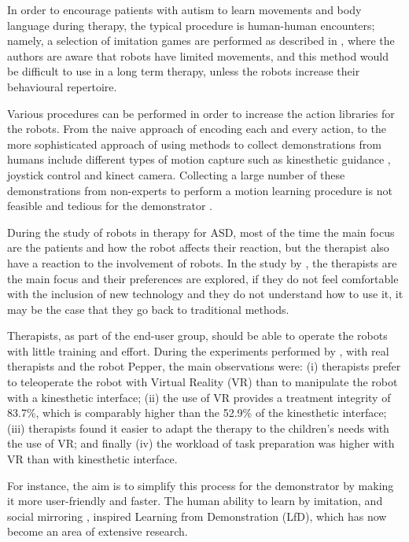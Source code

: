\documentclass[thesis]{mas_proposal}
\begin{document}
    In order to encourage patients with autism to learn movements and body language during therapy, the typical procedure is human-human encounters; namely, a selection of imitation games are performed as described in \cite{Dautenhahn2004}, where the authors are aware that robots have limited movements, and this method would be difficult to use in a long term therapy, unless the robots increase their behavioural repertoire.
    
    Various procedures can be performed in order to increase the action libraries for the robots. From the naive approach of encoding each and every action, to the more sophisticated approach of using methods to collect demonstrations from humans include different types of motion capture such as kinesthetic guidance \cite{Kronander2013}, joystick control \cite{Jiang2013} and kinect camera\cite{Assad2020}. Collecting a large number of these demonstrations from non-experts to perform a motion learning procedure is not feasible and tedious for the demonstrator \cite{Chen2022}.
    
    During the study of robots in therapy for ASD, most of the time the main focus are the patients and how the robot affects their reaction, but the therapist also have a reaction to the involvement of robots. In the study by \cite{Kulikovskiy2021}, the therapists are the main focus and their preferences are explored, if they do not feel comfortable with the inclusion of new technology and they do not understand how to use it, it may be the case that they go back to traditional methods.
    
    Therapists, as part of the end-user group, should be able to operate the robots with little training and effort. During the experiments performed by \cite{Kulikovskiy2021}, with real therapists and the robot Pepper, the main observations were: (i) therapists prefer to teleoperate the robot with Virtual Reality (VR) than to manipulate the robot with a kinesthetic interface; (ii) the use of VR provides a treatment integrity of 83.7\%, which is comparably higher than the 52.9\% of the kinesthetic interface; (iii) therapists found it easier to adapt the therapy to the children's needs with the use of VR; and finally (iv) the workload of task preparation was higher with VR than with kinesthetic interface. 
       
    For instance, the aim is to simplify this process for the demonstrator by making it more user-friendly and faster. The human ability to learn by imitation, and social mirroring \cite{Byrne2005}, inspired Learning from Demonstration (LfD), which has now become an area of extensive research.
    
\end{document}
